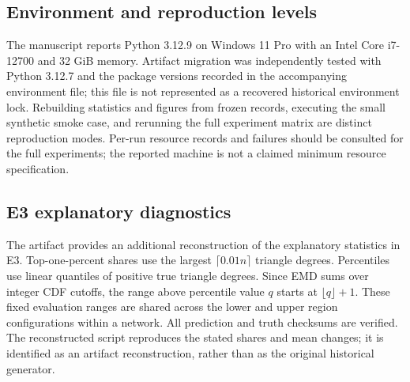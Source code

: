 \subsection*{Environment and reproduction levels}
The manuscript reports Python 3.12.9 on Windows 11 Pro with an Intel Core
i7-12700 and 32 GiB memory. Artifact migration was independently tested with
Python 3.12.7 and the package versions recorded in the accompanying environment
file; this file is not represented as a recovered historical environment lock.
Rebuilding statistics and figures from frozen records, executing the small
synthetic smoke case, and rerunning the full experiment matrix are distinct
reproduction modes. Per-run resource records and failures should be consulted
for the full experiments; the reported machine is not a claimed minimum
resource specification.

\subsection*{E3 explanatory diagnostics}
The artifact provides an additional reconstruction of the explanatory
statistics in E3. Top-one-percent shares use the largest $\lceil0.01n\rceil$
triangle degrees. Percentiles use linear quantiles of positive true triangle
degrees. Since EMD sums over integer CDF cutoffs, the range above percentile
value $q$ starts at $\lfloor q\rfloor+1$. These fixed evaluation ranges are
shared across the lower and upper region configurations within a network.
All prediction and truth checksums are verified. The reconstructed script
reproduces the stated shares and mean changes; it is identified as an artifact
reconstruction, rather than as the original historical generator.
